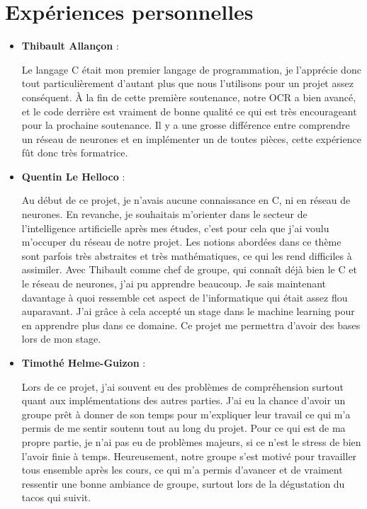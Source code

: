 \chapter{Expériences personnelles}

\begin{itemize}
    \item \textbf{Thibault Allançon} :

        Le langage C était mon premier langage de programmation, je l'apprécie
        donc tout particulièrement d'autant plus que nous l'utilisons pour un
        projet assez conséquent. À la fin de cette première soutenance, notre
        OCR a bien avancé, et le code derrière est vraiment de bonne qualité ce
        qui est très encourageant pour la prochaine soutenance. Il y a une
        grosse différence entre comprendre un réseau de neurones et en
        implémenter un de toutes pièces, cette expérience fût donc très
        formatrice.

    \item \textbf{Quentin Le Helloco} :

        Au début de ce projet, je n’avais aucune connaissance en C, ni en
        réseau de neurones. En revanche, je souhaitais m’orienter dans le
        secteur de l'intelligence artificielle après mes études, c'est pour cela
        que j'ai voulu m'occuper du réseau de notre projet. Les notions abordées
        dans ce thème sont parfois très abstraites et très mathématiques, ce qui
        les rend difficiles à assimiler. Avec Thibault comme chef de groupe, qui
        connaît déjà bien le C et le réseau de neurones, j’ai pu apprendre
        beaucoup. Je sais maintenant davantage à quoi ressemble cet aspect de
        l’informatique qui était assez flou auparavant. J’ai grâce à cela
        accepté un stage dans le machine learning pour en apprendre plus dans ce
        domaine. Ce projet me permettra d’avoir des bases lors de mon stage.

    \newpage

    \item \textbf{Timothé Helme-Guizon} :

        Lors de ce projet, j'ai souvent eu des problèmes de compréhension
        surtout quant aux implémentations des autres parties. J'ai eu la chance
        d'avoir un groupe prêt à donner de son temps pour m'expliquer leur
        travail ce qui m'a permis de me sentir soutenu tout au long du projet.
        Pour ce qui est de ma propre partie, je n'ai pas eu de problèmes
        majeurs, si ce n'est le stress de bien l'avoir finie à temps.
        Heureusement, notre groupe s'est motivé pour travailler tous ensemble
        après les cours, ce qui m'a permis d'avancer et de vraiment ressentir
        une bonne ambiance de groupe, surtout lors de la dégustation du tacos
        qui suivit.


\end{itemize}

